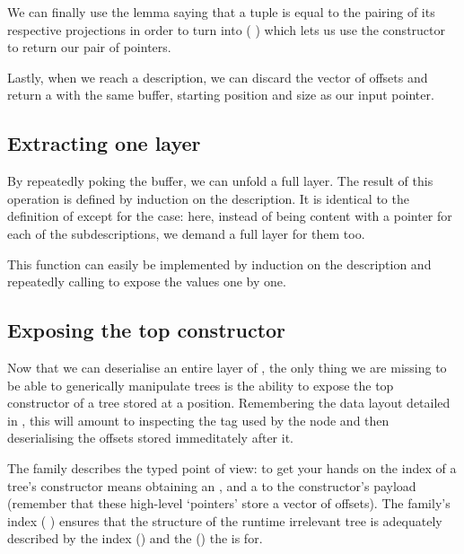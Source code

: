 We can finally use the lemma  saying that a tuple
is equal to the pairing of its respective projections
in order to turn  into
(  \IdrisData{\#}  )
which lets us use the  constructor \IdrisData{(\#)} to return our
pair of pointers.


Lastly, when we reach a  description, we can discard the
vector of offsets and return a  with the same buffer,
starting position and size as our input pointer.

\subsection{Extracting one layer}

By repeatedly poking the buffer, we can unfold a full layer.
The result of this operation is defined by induction
on the description. It is identical to the definition of
 except for the  case:
here, instead of being content with a pointer for each of the
subdescriptions, we demand a full layer for them too.


This function can easily be implemented by induction on the description
and repeatedly calling  to expose the values one by
one.


\subsection{Exposing the top constructor}

Now that we can deserialise an entire layer of ,
the only thing we are missing to be able to generically manipulate trees
is the ability to expose the top constructor of a tree stored at a
 position.
%
Remembering the data layout detailed in , this will
amount to inspecting the tag used by the node and then deserialising the
offsets stored immeditately after it.

The  family describes the typed point of view:
to get your hands on the index of a tree's constructor means
obtaining an ,
and a  to the constructor's payload
(remember that these high-level `pointers' store a vector of offsets).
%
The family's index ( \IdrisData{\#} )
ensures that the structure of the runtime irrelevant
tree is adequately described by
the index () and
the  () the  is for.

